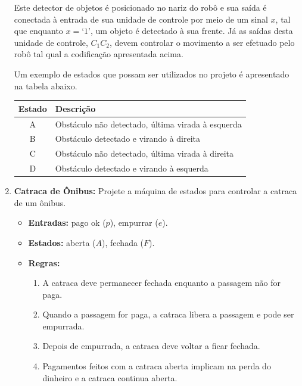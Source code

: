 \documentclass[12pt]{article}
\begin{document}
\begin{enumerate}[label=\textbf{\arabic*.}]
    Este detector de objetos é posicionado no nariz do robô e sua saída é conectada à entrada de sua unidade de controle por meio de um sinal $x$, tal que enquanto $x = \text{`1'}$, um objeto é detectado à sua frente. Já as saídas desta unidade de controle, $C_1 C_2$, devem controlar o movimento a ser efetuado pelo robô tal qual a codificação apresentada acima.

    Um exemplo de estados que possam ser utilizados no projeto é apresentado na tabela abaixo.
    \begin{table}[H]
        \centering
        \begin{tabular}{|c|l|}
            \hline
            \textbf{Estado} & \textbf{Descrição} \\ \hline
            A & Obstáculo não detectado, última virada à esquerda \\ \hline
            B & Obstáculo detectado e virando à direita \\ \hline
            C & Obstáculo não detectado, última virada à direita \\ \hline
            D & Obstáculo detectado e virando à esquerda \\ \hline
        \end{tabular}
    \end{table}
    
\item \textbf{Catraca de Ônibus:} Projete a máquina de estados para controlar a catraca de um ônibus.
    \begin{itemize}
        \item \textbf{Entradas:} pago ok ($p$), empurrar ($e$).
        \item \textbf{Estados:} aberta ($A$), fechada ($F$).
        \item \textbf{Regras:}
        \begin{enumerate}
            \item A catraca deve permanecer fechada enquanto a passagem não for paga.
            \item Quando a passagem for paga, a catraca libera a passagem e pode ser empurrada.
            \item Depois de empurrada, a catraca deve voltar a ficar fechada.
            \item Pagamentos feitos com a catraca aberta implicam na perda do dinheiro e a catraca continua aberta.
        \end{enumerate}
    \end{itemize}


\end{enumerate}
\end{document}
